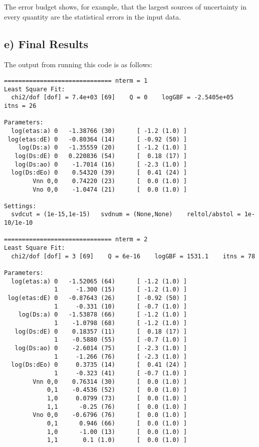 \documentclass[letterpaper,10pt,english]{sphinxmanual}
\begin{document}
The error budget shows, for example, that the largest sources of uncertainty
in every quantity are the statistical errors in the input data.


\subsection{e) Final Results}
\label{corrfitter:e-final-results}
The output from running this code is as follows:

\begin{Verbatim}[commandchars=\\\{\}]
============================== nterm = 1
Least Square Fit:
  chi2/dof [dof] = 7.4e+03 [69]    Q = 0    logGBF = -2.5405e+05    itns = 26

Parameters:
  log(etas:a) 0   -1.38766 (30)      [ -1.2 (1.0) ]
 log(etas:dE) 0   -0.80364 (14)      [ -0.92 (50) ]
    log(Ds:a) 0   -1.35559 (20)      [ -1.2 (1.0) ]
   log(Ds:dE) 0   0.220836 (54)      [  0.18 (17) ]
   log(Ds:ao) 0    -1.7014 (16)      [ -2.3 (1.0) ]
  log(Ds:dEo) 0    0.54320 (39)      [  0.41 (24) ]
        Vnn 0,0    0.74220 (23)      [  0.0 (1.0) ]
        Vno 0,0    -1.0474 (21)      [  0.0 (1.0) ]

Settings:
  svdcut = (1e-15,1e-15)   svdnum = (None,None)    reltol/abstol = 1e-10/1e-10

============================== nterm = 2
Least Square Fit:
  chi2/dof [dof] = 3 [69]    Q = 6e-16    logGBF = 1531.1    itns = 78

Parameters:
  log(etas:a) 0   -1.52065 (64)      [ -1.2 (1.0) ]
              1     -1.300 (15)      [ -1.2 (1.0) ]
 log(etas:dE) 0   -0.87643 (26)      [ -0.92 (50) ]
              1     -0.331 (10)      [ -0.7 (1.0) ]
    log(Ds:a) 0   -1.53878 (66)      [ -1.2 (1.0) ]
              1    -1.0798 (68)      [ -1.2 (1.0) ]
   log(Ds:dE) 0    0.18357 (11)      [  0.18 (17) ]
              1    -0.5880 (55)      [ -0.7 (1.0) ]
   log(Ds:ao) 0    -2.6014 (75)      [ -2.3 (1.0) ]
              1     -1.266 (76)      [ -2.3 (1.0) ]
  log(Ds:dEo) 0     0.3735 (14)      [  0.41 (24) ]
              1     -0.323 (41)      [ -0.7 (1.0) ]
        Vnn 0,0    0.76314 (30)      [  0.0 (1.0) ]
            0,1    -0.4536 (52)      [  0.0 (1.0) ]
            1,0     0.0799 (73)      [  0.0 (1.0) ]
            1,1      -0.25 (76)      [  0.0 (1.0) ]
        Vno 0,0    -0.6796 (76)      [  0.0 (1.0) ]
            0,1      0.946 (66)      [  0.0 (1.0) ]
            1,0      -1.00 (13)      [  0.0 (1.0) ]
            1,1       0.1 (1.0)      [  0.0 (1.0) ]


\end{Verbatim}
\end{document}
